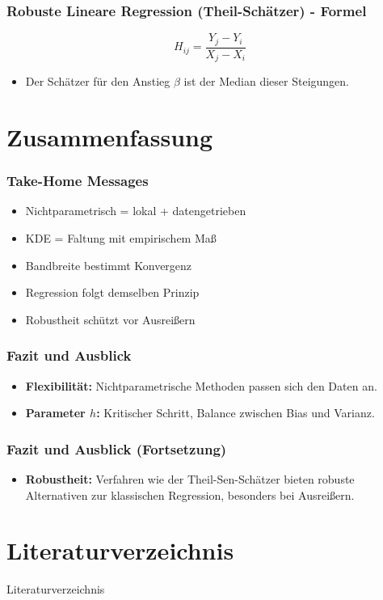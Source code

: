 \documentclass{beamer}
\begin{document}
	\begin{frame}
		\frametitle{Robuste Lineare Regression (Theil-Schätzer) - Formel}
		
		\begin{equation}
			H_{ij} = \frac{Y_j - Y_i}{X_j - X_i}
		\end{equation}
		\begin{itemize}
			\item Der Schätzer für den Anstieg $\beta$ ist der Median dieser Steigungen.
		\end{itemize}
	\end{frame}
	
	\section{Zusammenfassung}
	
	\begin{frame}
		\frametitle{Take-Home Messages}
		
		\begin{itemize}
			\item Nichtparametrisch = lokal + datengetrieben
			\item KDE = Faltung mit empirischem Maß
			\item Bandbreite bestimmt Konvergenz
			\item Regression folgt demselben Prinzip
			\item Robustheit schützt vor Ausreißern
		\end{itemize}
	\end{frame}
	
	\begin{frame}
		\frametitle{Fazit und Ausblick }
		
		\begin{itemize}
			\item \textbf{Flexibilität:} Nichtparametrische Methoden passen sich den Daten an.
			\item \textbf{Parameter $h$:} Kritischer Schritt, Balance zwischen Bias und Varianz.
		\end{itemize}
	\end{frame}
	
	\begin{frame}
		\frametitle{Fazit und Ausblick (Fortsetzung)}
		
		\begin{itemize}
			\item \textbf{Robustheit:} Verfahren wie der Theil-Sen-Schätzer bieten robuste Alternativen zur klassischen Regression, besonders bei Ausreißern.
		\end{itemize}
	\end{frame}
	
	\section{Literaturverzeichnis}
	
	\begin{frame}[allowframebreaks]{Literaturverzeichnis}
		\printbibliography
	\end{frame}
	
\end{document}
